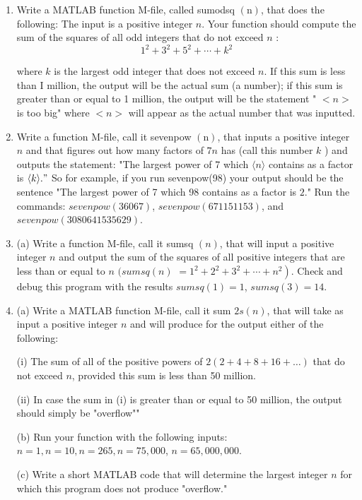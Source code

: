 \documentclass[../main.tex]{subfiles}
\begin{document}
\begin{enumerate}
\item Write a MATLAB function M-file, called sumodsq $(\mathrm{n})$, that does the following: The input is a positive integer $n$. Your function should compute the sum of the squares of all odd integers that do not exceed $n$ :
$$
1^{2}+3^{2}+5^{2}+\cdots+k^{2}
$$

where $k$ is the largest odd integer that does not exceed $n$. If this sum is less than I million, the output will be the actual sum (a number); if this sum is greater than or equal to 1 million, the output will be the statement " $<n>$ is too big" where $<n>$ will appear as the actual number that was inputted.

\item Write a function $\mathrm{M}$-file, call it sevenpow $(\mathrm{n})$, that inputs a positive integer $n$ and that figures out how many factors of $7 n$ has (call this number $k$ ) and outputs the statement: "The largest power of 7 which $\langle n\rangle$ contains as a factor is $\langle k\rangle . "$ So for example, if you run sevenpow(98) your output should be the sentence "The largest power of 7 which 98 contains as a factor is $2$." Run the commands: $sevenpow(36067)$, $sevenpow (671151153)$, and $sevenpow (3080641535629)$.
 
\item (a) Write a function M-file, call it sumsq $(n)$, that will input a positive integer $n$ and output the sum of the squares of all positive integers that are less than or equal to $n$ $(sumsq(n)$ $\left.=1^{2}+2^{2}+3^{2}+\cdots+n^{2}\right)$. Check and debug this program with the results $sumsq(1)=1$, $sumsq(3)=14$.

\item (a) Write a MATLAB function M-file, call it sum $2 s(n)$, that will take as input a positive integer $n$ and will produce for the output either of the following:

(i) The sum of all of the positive powers of $2(2+4+8+16+\ldots)$ that do not exceed $n$, provided this sum is less than 50 million.

(ii) In case the sum in (i) is greater than or equal to 50 million, the output should simply be "overflow""

(b) Run your function with the following inputs: $n=1, n=10, n=265, n=75,000$, $n=65,000,000$. 

(c) Write a short MATLAB code that will determine the largest integer $n$ for which this program does not produce "overflow."


\end{enumerate}
\end{document}
